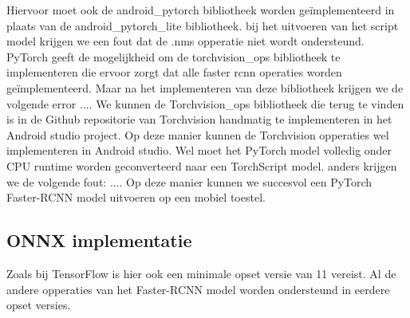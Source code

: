 Hiervoor moet ook de android\_pytorch bibliotheek worden ge\"implementeerd in plaats van de android\_pytorch\_lite bibliotheek.
bij het uitvoeren van het script model krijgen we een fout dat de .nms opperatie niet wordt ondersteund.
PyTorch geeft de mogelijkheid om de torchvision\_ops bibliotheek te implementeren die ervoor zorgt dat alle faster rcnn operaties worden ge\"implementeerd.
Maar na het implementeren van deze bibliotheek krijgen we de volgende error ....
We kunnen de Torchvision\_ops bibliotheek die terug te vinden is in de Github repositorie van Torchvision handmatig te implementeren in het Android studio project.
Op deze manier kunnen de Torchvision opperaties wel implementeren in Android studio.
Wel moet het PyTorch model volledig onder CPU runtime worden geconverteerd naar een TorchScript model.
anders krijgen we de volgende fout: .... %
Op deze manier kunnen we succesvol een PyTorch Faster-RCNN model uitvoeren op een mobiel toestel.

\subsection{ONNX implementatie}
Zoals bij TensorFlow is hier ook een minimale opset versie van 11 vereist.
Al de andere opperaties van het Faster-RCNN model worden ondersteund in eerdere opset versies.

